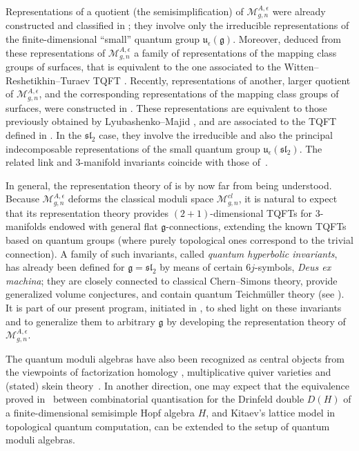 \documentclass[pdftex]{sigma}
\numberwithin{equation}{section}
\theoremstyle{definition}
\newcommand{\e}{\epsilon}
\newcommand{\Mm}{{\mathcal M}}
\begin{document}
Representations of a quotient (the semisimplification) of $\Mm_{g,n}^{A, \e}$ were already constructed and classified in \cite{AG3}; they involve only the irreducible representations of the finite-dimensional ``small'' quantum group $\mathfrak{u}_{\e}(\mathfrak{g})$. Moreover, \cite{AG3} deduced from these representations of $\Mm_{g,n}^{A, \e}$ a family of representations of the mapping class groups of surfaces, that is equivalent to the one associated to the Witten--Reshetikhin--Turaev TQFT \cite{RT,Wi}. Recently, representations of another, larger quotient of $\Mm_{g,n}^{A, \e}$, and the corresponding representations of the mapping class groups of surfaces, were constructed in \cite{Faitg,Faitg2}. These representations are equivalent to those previously obtained by Lyubashenko--Majid \cite{LM}, and are associated to the TQFT defined in \cite{dRGGP-MR,dRGP-M}. In the ${\mathfrak{sl}_2}$ case, they involve the irreducible and also the principal indecomposable representations of the small quantum group $\mathfrak{u}_{\e}({\mathfrak{sl}_2})$. The related link and $3$-manifold invariants coincide with those of~\cite{BBG,Mu}.%

In general, the representation theory of \smash{$\Mm_{g,n}^{A, \e}$} is by now far from being understood. Because $\Mm_{g,n}^{A, \e}$ deforms the classical moduli space $\Mm_{g,n}^{cl}$, it is natural to expect that its representation theory provides $(2+1)$-dimensional TQFTs for $3$-manifolds endowed with general flat $\mathfrak{g}$-connections, extending the known TQFTs based on quantum groups (where purely topological ones correspond to the trivial connection). A family of such invariants, called {\it quantum hyperbolic invariants}, has already been defined for $\mathfrak{g}={\mathfrak{sl}_2}$ by means of certain $6j$-symbols, {\it Deus ex machina}; they are closely connected to classical Chern--Simons theory, provide generalized volume conjectures, and contain quantum Teichm\"uller theory (see \cite{BB-3,BB-2,BB-1,BB0,BB1,BB2,BB3}). It is part of our present program, initiated in \cite{B}, to shed light on these invariants and to generalize them to arbitrary $\mathfrak{g}$ by developing the representation theory of $\Mm_{g,n}^{A, \e}$.

 The quantum moduli algebras have also been recognized as central objects from the viewpoints of factorization homology \cite{B-BZ-J}, multiplicative quiver varieties \cite{GJS19} and (stated) skein theory~\mbox{\cite{BFR,BFK,CL,Faitg4}}. In another direction, one may expect that the equivalence proved in~\cite{Meus} between combinatorial quantisation for the Drinfeld double $D(H)$ of a finite-dimensional semisimple Hopf algebra $H$, and Kitaev's lattice model in topological quantum computation, can be extended to the setup of quantum moduli algebras.
\end{document}
